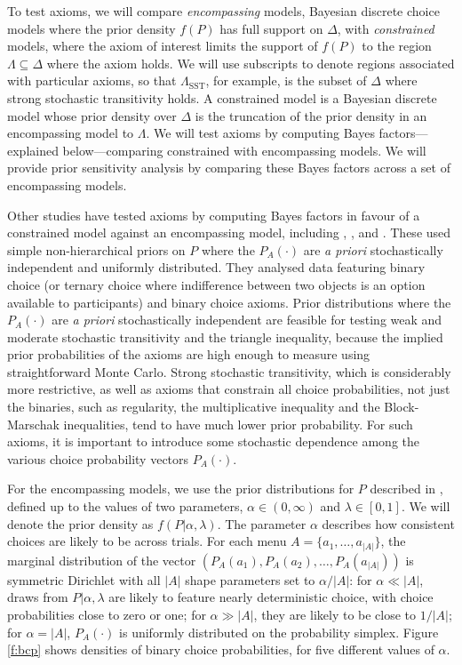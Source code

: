 \documentclass[11pt,letter]{article}
\newcommand{\menu}{menu}
\begin{document}
To test axioms, we will compare {\em encompassing} models, Bayesian discrete choice models where the prior density $f(P)$ has full support on $\Delta$, with {\em constrained} models, where the axiom of interest limits the support of $f(P)$ to the region $\Lambda \subseteq \Delta$ where the axiom holds.
We will use subscripts to denote regions associated with particular axioms, so that $\Lambda_{\mathrm{SST}}$, for example, is the subset of $\Delta$ where strong stochastic transitivity holds.
A constrained model is a Bayesian discrete model whose prior density over $\Delta$ is the truncation of the prior density in an encompassing model to $\Lambda$.
We will test axioms by computing Bayes factors---explained below---comparing constrained with encompassing models.
We will provide prior sensitivity analysis by comparing these Bayes factors across a set of encompassing models.

Other studies have tested axioms by computing Bayes factors in favour of a constrained model against an encompassing model, including , ,  and .
These used simple non-hierarchical priors on $P$ where the $P_A(\cdot)$ are {\em a priori} stochastically independent and uniformly distributed.
They analysed data featuring binary choice (or ternary choice where indifference between two objects is an option available to participants) and binary choice axioms.
Prior distributions where the $P_A(\cdot)$ are {\em a priori} stochastically independent are feasible for testing weak and moderate stochastic transitivity and the triangle inequality, because the implied prior probabilities of the axioms are high enough to measure using straightforward Monte Carlo.
Strong stochastic transitivity, which is considerably more restrictive, as well as axioms that constrain all choice probabilities, not just the binaries, such as regularity, the multiplicative inequality and the Block-Marschak inequalities, tend to have much lower prior probability.
For such axioms, it is important to introduce some stochastic dependence among the various choice probability vectors $P_A(\cdot)$.

For the encompassing models, we use the prior distributions for $P$ described in , defined up to the values of two parameters, $\alpha \in (0,\infty)$ and $\lambda \in [0,1]$.
We will denote the prior density as $f(P|\alpha,\lambda)$.
The parameter $\alpha$ describes how consistent choices are likely to be across trials.
For each \menu{} $A = \{a_1,\ldots,a_{|A|}\}$, the marginal distribution of the vector $(P_A(a_1), P_A(a_2), \ldots, P_A(a_{|A|}))$ is symmetric Dirichlet with all $|A|$ shape parameters set to $\alpha / |A|$: for $\alpha \ll |A|$, draws from $P|\alpha,\lambda$ are likely to feature nearly deterministic choice, with choice probabilities close to zero or one; for $\alpha \gg |A|$, they are likely to be close to $1/|A|$; for $\alpha = |A|$, $P_A(\cdot)$ is uniformly distributed on the probability simplex.
Figure \ref{f:bcp} shows densities of binary choice probabilities, for five different values of $\alpha$.
\end{document}
